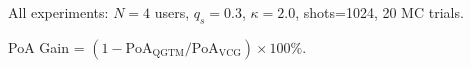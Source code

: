 
\begin{table}[!t]
\centering
\caption{Cross-Backend Hardware Validation of QGTM}
\label{tab:cross_backend}
\renewcommand{\arraystretch}{1.35}
\begin{tablenotes}\small
\item All experiments: $N=4$ users, $q_s=0.3$, $\kappa=2.0$, shots=1024, 20 MC trials.
\item PoA Gain = $(1 - \text{PoA}_\text{QGTM} / \text{PoA}_\text{VCG}) \times 100\%$.
\end{tablenotes}
\end{table}
